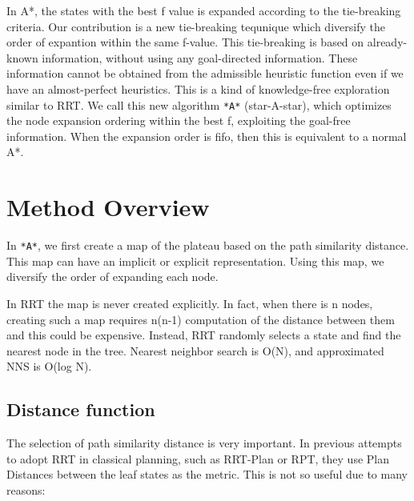 
In A*, the states with the best f value is expanded according to the
tie-breaking criteria. Our contribution is a new tie-breaking tequnique
which diversify the order of expantion within the same f-value.
This tie-breaking is based on already-known information,
without using any goal-directed information.
These information cannot be obtained from the admissible heuristic function even if we
have an almost-perfect heuristics.
This is a kind of knowledge-free exploration similar to RRT.
We call this new algorithm \texttt{*A*} (star-A-star), which optimizes the node
expansion ordering within the best f, exploiting the goal-free information.
When the expansion order is fifo, then this is equivalent to a normal A*.
\section{Method Overview}
\label{sec-2}


In \texttt{*A*}, we first create a map of the plateau based on the path similarity
distance. This map can have an implicit or explicit representation.
Using this map, we diversify the order of expanding each node.

In RRT the map is never created explicitly.
In fact, when there is n nodes, creating such a map requires n(n-1) computation of the distance
between them and this could be expensive. Instead, RRT randomly selects a state
and find the nearest node in the tree. Nearest neighbor search is O(N), and
approximated NNS is O(log N).

\subsection{Distance function}
\label{sec-2-1}

The selection of path similarity distance is very important.
In previous attempts to adopt RRT in classical planning, such as
RRT-Plan or RPT, they use Plan Distances between the leaf states as the
metric. This is not so useful due to many reasons:

